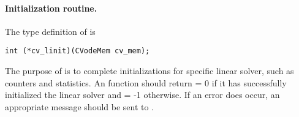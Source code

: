 \paragraph{Initialization routine.}
The type definition of  is
\begin{verbatim}
int (*cv_linit)(CVodeMem cv_mem);
\end{verbatim}
The purpose of  is to complete initializations for      
specific linear solver, such as counters and statistics.        
An  function should return  = 0 if it 
has successfully initialized the {\cvodes} linear solver and 
 = -1 otherwise. 
If an error does occur, an appropriate message should be sent 
to .

